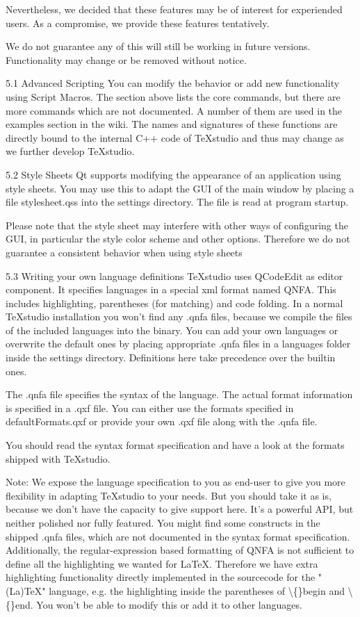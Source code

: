 \documentclass{article}
\begin{document}
	Nevertheless, we decided that these features may be of interest for experiended users. As a compromise, we provide these features tentatively.
	
	We do not guarantee any of this will still be working in future versions. Functionality may change or be removed without notice.
	
	5.1 Advanced Scripting
	You can modify the behavior or add new functionality using Script Macros. The section above lists the core commands, but there are more commands which are not documented. A number of them are used in the examples section in the wiki. The names and signatures of these functions are directly bound to the internal C++ code of TeXstudio and thus may change as we further develop TeXstudio.
	
	5.2 Style Sheets
	Qt supports modifying the appearance of an application using style sheets. You may use this to adapt the GUI of the main window by placing a file stylesheet.qss into the settings directory. The file is read at program startup.
	
	Please note that the style sheet may interfere with other ways of configuring the GUI, in particular the style color scheme and other options. Therefore we do not guarantee a consistent behavior when using style sheets
	
	5.3 Writing your own language definitions
	TeXstudio uses QCodeEdit as editor component. It specifies languages in a special xml format named QNFA. This includes highlighting, parentheses (for matching) and code folding. In a normal TeXstudio installation you won't find any .qnfa files, because we compile the files of the included languages into the binary. You can add your own languages or overwrite the default ones by placing appropriate .qnfa files in a languages folder inside the settings directory. Definitions here take precedence over the builtin ones.
	
	The .qnfa file specifies the syntax of the language. The actual format information is specified in a .qxf file. You can either use the formats specified in defaultFormats.qxf or provide your own .qxf file along with the .qnfa file.
	
	You should read the syntax format specification and have a look at the formats shipped with TeXstudio.
	
	Note: We expose the language specification to you as end-user to give you more flexibility in adapting TeXstudio to your needs. But you should take it as is, because we don't have the capacity to give support here. It's a powerful API, but neither polished nor fully featured. You might find some constructs in the shipped .qnfa files, which are not documented in the syntax format specification. Additionally, the regular-expression based formatting of QNFA is not sufficient to define all the highlighting we wanted for LaTeX. Therefore we have extra highlighting functionality directly implemented in the sourcecode for the "(La)TeX" language, e.g. the highlighting inside the parentheses of \textbackslash\{\}begin and \textbackslash\{\}end. You won't be able to modify this or add it to other languages.
	
\end{document}
